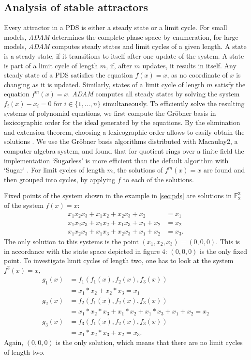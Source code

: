 \documentclass[10pt]{bmc_article}
\newenvironment{bmcformat}{\fussy\setboolean{publ}{true}}{\fussy}
\begin{document}
\begin{bmcformat}
\subsection{Analysis of stable attractors}
Every attractor in a PDS is either a
steady state or a limit cycle. For small models, {\it ADAM} determines the complete
phase space by enumeration, for large models, {\it ADAM} computes steady states and
limit cycles of a given length.
A state is a steady state, if it transitions to itself after one update of the
system. A state is part of a limit cycle of length $m$, if,
after $m$ updates, it results in itself. Any steady state of a PDS satisfies
the equation $f(x) = x$, as no coordinate of $x$ is changing as it is updated.
Similarly, states of a
limit cycle of length $m$ satisfy the equation $f^m(x) = x$. {\it ADAM} computes all
steady states by solving the system $f_i(x) - x_i = 0$ for $i \in \{1, \ldots,
n\}$ simultaneously. To efficiently solve the resulting systems of polynomial
equations, we first compute the Gr\"obner
basis in lexicographic order for the ideal generated by the equations.
By the elimination and extension theorem, choosing a lexicographic order
allows to easily obtain the solutions \cite{IVA}.
We use the Gr\"obner basis algorithms distributed with Macaulay2, a
computer algebra system, and found that for quotient rings over a finite field
the implementation `Sugarless' is more efficient than the default algorithm
with `Sugar' \cite{M2,Sugar:1991}.
For limit cycles of length $m$, the solutions of $f^m(x)=x$ are found and then
grouped into cycles, by applying $f$ to each of the solutions.

\begin{example}
	Fixed points of the system shown in the example in \ref{sec:pds} are solutions in $\mathbb F_2^3$ of the system $f(x)=x$:
	\begin{align*}
	 x_1x_2x_3+x_1x_2+x_2x_3+x_2  &= x_1\\
	 x_1x_2x_3+x_1x_2+x_1x_3+x_1+x_2 &= x_2 \\
	 x_1x_2x_3+x_1x_3+x_2x_3+x_1+x_2 &= x_3.
	\end{align*}
	The only solution to this systems is the point $(x_1, x_2,x_3 ) = (0,0,0)$. This is in accordance with the state space depicted in figure 4: $(0,0,0)$ is the only fixed point. To investigate limit cycles of length two, one has to look at the system $f^2(x) = x$,
	\begin{align*}
	g_1(x) &= f_1(f_1(x), f_2(x), f_3(x) ) \\
		&= x_1*x_2+x_2*x_3 = x_1 \\
	g_2(x) &= f_2(f_1(x), f_2(x), f_3(x) ) \\
		&= x_1*x_2*x_3+x_1*x_2+x_1*x_3+x_1+x_2 = x_2\\
	g_3(x) &= f_3(f_1(x), f_2(x), f_3(x) ) \\
		&= x_1*x_2*x_3+x_2 = x_3.
	\end{align*}
	Again, $(0,0,0)$ is the only solution, which means that there are no limit cycles of length two. 


\end{example}
\end{bmcformat}
\end{document}
